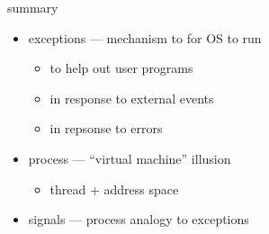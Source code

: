 \begin{frame}{summary}
\begin{itemize}
\item exceptions --- mechanism to for OS to run
    \begin{itemize}
    \item to help out user programs
    \item in response to external events
    \item in repsonse to errors
    \end{itemize}
\item process --- ``virtual machine'' illusion
    \begin{itemize}
    \item thread + address space
    \end{itemize}
\item signals --- process analogy to exceptions
\end{itemize}
\end{frame}


